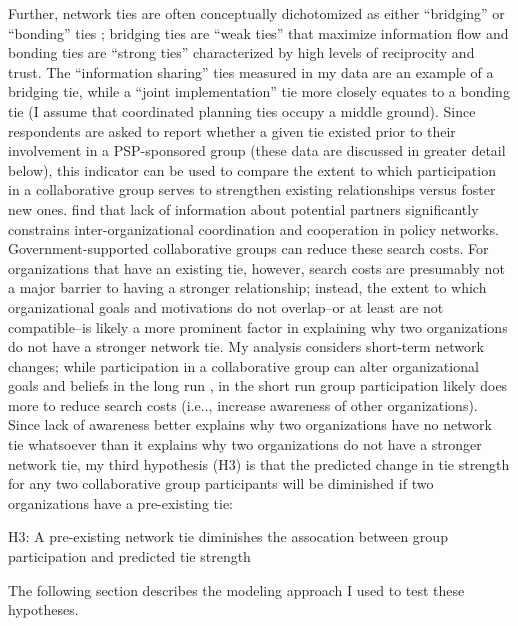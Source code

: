 \documentclass[12pt,a4paper,titlepage]{article}
\begin{document}
Further, network ties are often conceptually dichotomized as either ``bridging'' or ``bonding'' ties \parencite{berardo2010,berardo2014}; bridging ties are ``weak ties'' \parencite{granovetter1985} that maximize information flow and bonding ties are ``strong ties'' characterized by high levels of reciprocity and trust. The ``information sharing'' ties measured in my data are an example of a bridging tie, while a ``joint implementation'' tie more closely equates to a bonding tie (I assume that coordinated planning ties occupy a middle ground). Since respondents are asked to report whether a given tie existed prior to their involvement in a PSP-sponsored group (these data are discussed in greater detail below), this indicator can be used to compare the extent to which participation in a collaborative group serves to strengthen existing relationships versus foster new ones. \textcite{scholz2008} find that lack of information about potential partners significantly constrains inter-organizational coordination and cooperation in policy networks. Government-supported collaborative groups can reduce these search costs. For organizations that have an existing tie, however, search costs are presumably not a major barrier to having a stronger relationship; instead, the extent to which organizational goals and motivations do not overlap--or at least are not compatible--is likely a more prominent factor in explaining why two organizations do not have a stronger network tie. My analysis considers short-term network changes; while participation in a collaborative group can alter organizational goals and beliefs in the long run \parencite[e.g.,][]{bingham2008,leach2005,lubell2005}, in the short run group participation likely does more to reduce search costs (i.e.., increase awareness of other organizations). Since lack of awareness better explains why two organizations have no network tie whatsoever than it explains why two organizations do not have a stronger network tie, my third hypothesis (H3) is that the predicted change in tie strength for any two collaborative group participants will be diminished if two organizations have a pre-existing tie:

\singlespacing
\begin{description}
\item{H3: A pre-existing network tie diminishes the assocation between group participation and predicted tie strength}
\end{description}
\doublespacing

\noindent
The following section describes the modeling approach I used to test these hypotheses. 
\end{document}
